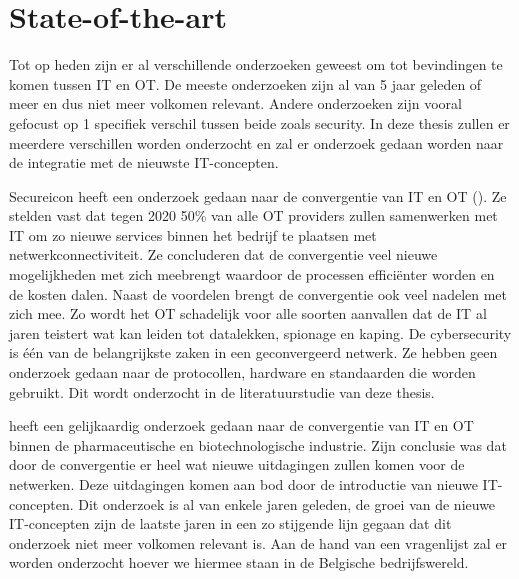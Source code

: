 
\section{State-of-the-art}
\label{sec:state-of-the-art}

Tot op heden zijn er al verschillende onderzoeken geweest om tot bevindingen te komen tussen IT en OT. De meeste onderzoeken zijn al van 5 jaar geleden of meer en dus niet meer volkomen relevant. Andere onderzoeken zijn vooral gefocust op 1 specifiek verschil tussen beide zoals security. In deze thesis zullen er meerdere verschillen worden onderzocht en zal er onderzoek gedaan worden naar de integratie met de nieuwste IT-concepten.


Secureicon heeft een onderzoek gedaan naar de convergentie van IT en OT (\cite{SecureiconTeam2019}). Ze stelden vast dat tegen 2020 50\% van alle OT providers zullen samenwerken met IT om zo nieuwe services binnen het bedrijf te plaatsen met netwerkconnectiviteit. Ze concluderen dat de convergentie veel nieuwe mogelijkheden met zich meebrengt waardoor de processen efficiënter worden en de kosten dalen. Naast de voordelen brengt de convergentie ook veel nadelen met zich mee. Zo wordt het OT schadelijk voor alle soorten aanvallen dat de IT al jaren teistert wat kan leiden tot datalekken, spionage en kaping. De cybersecurity is één van de belangrijkste zaken in een geconvergeerd netwerk. Ze hebben geen onderzoek gedaan naar de protocollen, hardware en standaarden die worden gebruikt. Dit wordt onderzocht in de literatuurstudie van deze thesis. 


\textcite{Pennerad2013} heeft een gelijkaardig onderzoek gedaan naar de convergentie van IT en OT binnen de pharmaceutische en biotechnologische industrie. Zijn conclusie was dat door de convergentie er heel wat nieuwe uitdagingen zullen komen voor de netwerken. Deze uitdagingen komen aan bod door de introductie van nieuwe IT-concepten. Dit onderzoek is al van enkele jaren geleden, de groei van de nieuwe IT-concepten zijn de laatste jaren in een zo stijgende lijn gegaan dat dit onderzoek niet meer volkomen relevant is. Aan de hand van een vragenlijst zal er worden onderzocht hoever we hiermee staan in de Belgische bedrijfswereld. 











